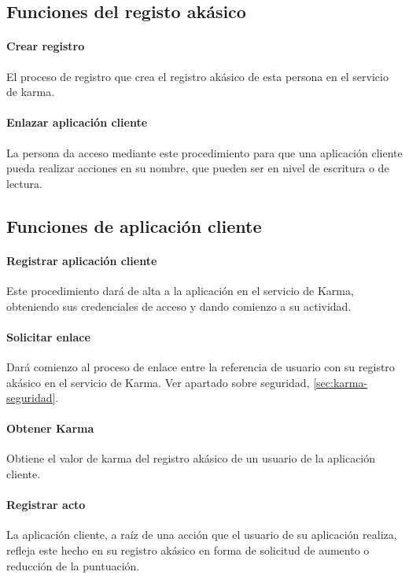 \documentclass[main]{subfiles}
\begin{document}
\subsection{Funciones del registo akásico}

\paragraph{Crear registro}
El proceso de registro que crea el registro akásico de esta persona en el servicio de karma.

\paragraph{Enlazar aplicación cliente}
La persona da acceso mediante este procedimiento para que una aplicación cliente pueda realizar acciones en su nombre, que pueden ser en nivel de escritura o de lectura.

\subsection{Funciones de aplicación cliente}

\paragraph{Registrar aplicación cliente}
Este procedimiento dará de alta a la aplicación en el servicio de Karma, obteniendo sus credenciales de acceso y dando comienzo a su actividad.

\paragraph{Solicitar enlace}
Dará comienzo al proceso de enlace entre la referencia de usuario con su registro akásico en el servicio de Karma. Ver apartado sobre seguridad, \cref{sec:karma-seguridad}.

\paragraph{Obtener Karma}
Obtiene el valor de karma del registro akásico de un usuario de la aplicación cliente.

\paragraph{Registrar acto}
La aplicación cliente, a raíz de una acción que el usuario de su aplicación realiza, refleja este hecho en su registro akásico en forma de solicitud de aumento o reducción de la puntuación.
\end{document}
